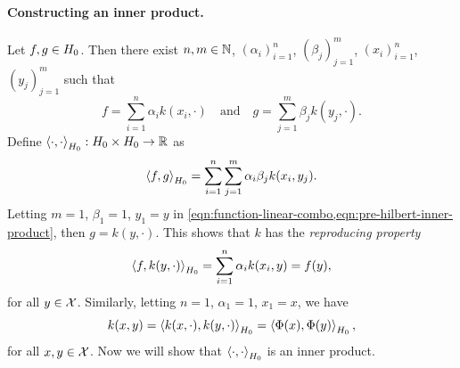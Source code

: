 \paragraph{Constructing an inner product.}

Let \(f,g \in H_0\).
Then there exist \(n, m \in \mathbb{N}\), \((\alpha_i)_{i=1}^n\), \((\beta_j)_{j=1}^m\), \((x_i)_{i=1}^n\), \((y_j)_{j=1}^m\) such that
\begin{equation}
    \label{eqn:function-linear-combo}
    f = \sum_{i=1}^{n} \alpha_i k(x_i, \cdot)
    \quad\text{and}\quad
    g = \sum_{j=1}^{m} \beta_j k(y_j, \cdot).
\end{equation}
Define \(\left\langle \cdot, \cdot \right\rangle_{H_0} : H_0 \times H_0 \to \mathbb{R}\) as
\begin{equation}
    \label{eqn:pre-hilbert-inner-product}
    \left\langle f, g \right\rangle_{H_0} 
    = \sum_{i=1}^{n} \sum_{j=1}^{m} \alpha_i \beta_j k(x_i, y_j).
\end{equation}
Letting \(m=1\), \(\beta_1=1\), \(y_1 = y\) in \cref{eqn:function-linear-combo,eqn:pre-hilbert-inner-product}, then \(g = k(y,\cdot)\).
This shows that \(k\) has the \textit{reproducing property}
\begin{equation}
    \label{eqn:reproducing-property}
    \left\langle f, k(y, \cdot) \right\rangle_{H_0} = \sum_{i=1}^{n} \alpha_i k(x_i, y) = f(y),
\end{equation}
for all \(y \in \mathcal{X}\).
Similarly, letting \(n=1\), \(\alpha_1=1\), \(x_1=x\), we have
\begin{equation}
    \label{eqn:kernel-is-inner-product}
    k(x,y) = \left\langle k(x,\cdot), k(y,\cdot) \right\rangle_{H_0} = \left\langle \Phi(x), \Phi(y) \right\rangle_{H_0},
\end{equation}
for all \(x,y \in \mathcal{X}\).
Now we will show that \(\left\langle \cdot, \cdot \right\rangle_{H_0}\) is an inner product.

